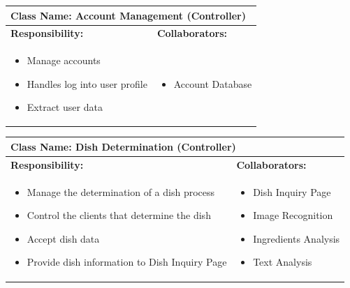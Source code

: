 \documentclass[]{article}
\begin{document}
\begin{table}[H]
	\centering
	\begin{tabular}{|p{7cm}|p{7cm}|}
	\hline 
	 \multicolumn{2}{|l|}{\textbf{Class Name: Account Management (Controller)}} \\
	\hline
	\textbf{Responsibility:} & \textbf{Collaborators:} \\
	\hline
	\raggedright
	\begin{itemize}
		\item Manage accounts
		\item Handles log into user profile
		\item Extract user data
	\end{itemize}
	\vspace{1in} & 
	\begin{itemize}
		\item Account Database
	\end{itemize} \\
	\hline
	\end{tabular}
\end{table}

\begin{table}[H]
	\centering
	\begin{tabular}{|p{7cm}|p{7cm}|}
	\hline 
	 \multicolumn{2}{|l|}{\textbf{Class Name: Dish Determination (Controller)}} \\
	\hline
	\textbf{Responsibility:} & \textbf{Collaborators:} \\
	\hline
	\raggedright
	\begin{itemize}
		\item Manage the determination of a dish process
		\item Control the clients that determine the dish
		\item Accept dish data
		\item Provide dish information to Dish Inquiry Page
	\end{itemize}
	\vspace{1in} & 
	\begin{itemize}
		\item Dish Inquiry Page
		\item Image Recognition
		\item Ingredients Analysis
		\item Text Analysis
	\end{itemize} \\
	\hline
	\end{tabular}
\end{table}
\end{document}
